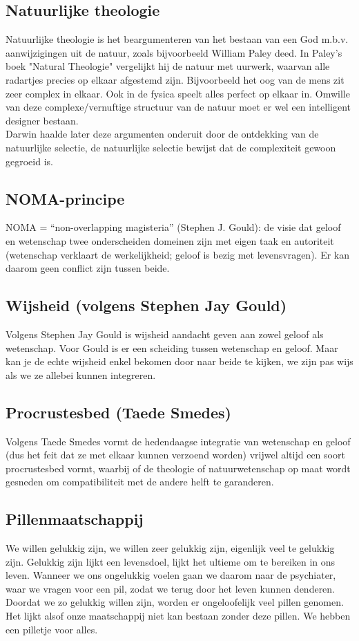 \documentclass[11pt,a4paper,titlepage]{article}
\begin{document}
\subsection{Natuurlijke theologie }
Natuurlijke theologie is het beargumenteren van het bestaan van een God m.b.v. aanwijzigingen uit de natuur, zoals bijvoorbeeld William Paley deed. In Paley's boek "Natural Theologie" vergelijkt hij de natuur met uurwerk, waarvan alle radartjes precies op elkaar afgestemd zijn. Bijvoorbeeld het oog van de mens zit zeer complex in elkaar.  Ook in de fysica speelt alles perfect op elkaar in. Omwille van deze complexe/vernuftige structuur van de natuur moet er wel een intelligent designer bestaan. \\ Darwin haalde later deze argumenten onderuit door de ontdekking van de natuurlijke selectie, de natuurlijke selectie bewijst dat de complexiteit gewoon gegroeid is.

\subsection{NOMA-principe}
NOMA = “non-overlapping magisteria” (Stephen J. Gould): de visie dat geloof en wetenschap twee onderscheiden domeinen zijn met eigen taak en autoriteit (wetenschap verklaart de werkelijkheid; geloof is bezig met levensvragen). Er kan daarom geen conflict zijn tussen beide.

\subsection{Wijsheid (volgens Stephen Jay Gould)}
Volgens Stephen Jay Gould is wijsheid aandacht geven aan zowel geloof als wetenschap. Voor Gould is er een scheiding tussen wetenschap en geloof. Maar kan je de echte wijsheid enkel bekomen door naar beide te kijken, we zijn pas wijs als we ze allebei kunnen integreren.

\subsection{Procrustesbed (Taede Smedes)}
Volgens Taede Smedes vormt de hedendaagse integratie van wetenschap en geloof (dus het feit dat ze met elkaar kunnen verzoend worden) vrijwel altijd een
soort procrustesbed vormt, waarbij of de theologie of natuurwetenschap op maat wordt gesneden om compatibiliteit met de andere helft te garanderen.

\subsection{Pillenmaatschappij}
We willen gelukkig zijn, we willen zeer gelukkig zijn, eigenlijk veel te gelukkig zijn. Gelukkig zijn lijkt een levensdoel, lijkt het ultieme om te bereiken in ons leven. Wanneer we ons ongelukkig voelen gaan we daarom naar de psychiater, waar we vragen voor een pil, zodat we terug door het leven kunnen denderen. Doordat we zo gelukkig willen zijn, worden er ongeloofelijk veel pillen genomen. Het lijkt alsof onze maatschappij niet kan bestaan zonder deze pillen. We hebben een pilletje voor alles.
\end{document}
